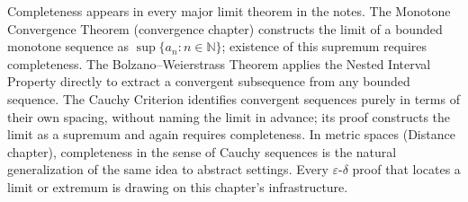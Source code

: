 

\begin{remark*}[Interpretation]
Completeness appears in every major limit theorem in the notes.
The Monotone Convergence Theorem (convergence chapter) constructs the
limit of a bounded monotone sequence as $\sup\{a_n : n \in \mathbb{N}\}$;
existence of this supremum requires completeness.
The Bolzano--Weierstrass Theorem applies the Nested Interval Property
directly to extract a convergent subsequence from any bounded sequence.
The Cauchy Criterion identifies convergent sequences purely in terms of
their own spacing, without naming the limit in advance; its proof
constructs the limit as a supremum and again requires completeness.
In metric spaces (Distance chapter), completeness in the sense of
Cauchy sequences is the natural generalization of the same idea to
abstract settings.
Every $\varepsilon$-$\delta$ proof that locates a limit or extremum is
drawing on this chapter's infrastructure.
\end{remark*}
